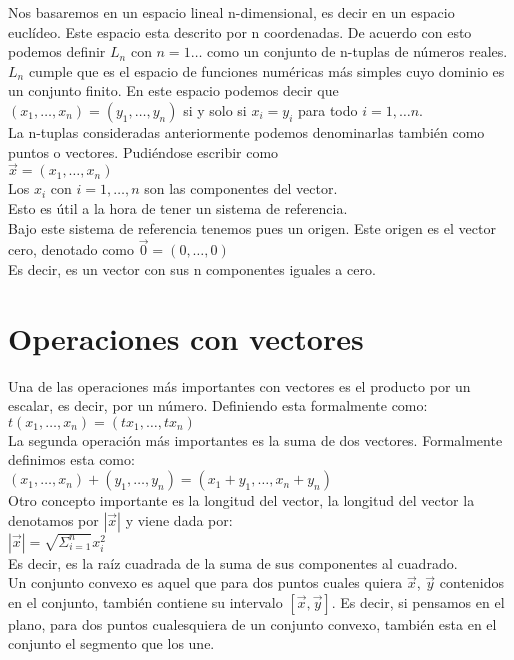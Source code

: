 \documentclass[10pt,a4paper]{book}
\begin{document}
Nos basaremos en un espacio lineal n-dimensional, es decir en un espacio euclídeo. Este espacio esta descrito por n coordenadas. De acuerdo con esto podemos definir $L_n$ con $n=1 \ldots$ como un conjunto de n-tuplas de números reales. $L_n$ cumple que es el espacio de funciones numéricas más simples cuyo dominio es un conjunto finito. En este espacio podemos decir que $(x_1, \ldots , x_n ) = (y_1, \ldots , y_n )$ si y solo si $x_i=y_i$ para todo $i=1, \ldots n$.\\
La n-tuplas consideradas anteriormente podemos denominarlas también como puntos o vectores. Pudiéndose escribir como \\
$\overrightarrow{x}=(x_1, \ldots , x_n )$\\
Los $x_i$ con $i=1 , \ldots, n $ son las componentes del vector.\\

Esto es útil a la hora de tener un sistema de referencia.\\
Bajo este sistema de referencia tenemos pues un origen. Este origen es el vector cero, denotado como $\overrightarrow{0}=(0, \ldots , 0 )$\\
Es decir, es un vector con sus n componentes iguales a cero.\\

\section{Operaciones con vectores}

Una de las operaciones más importantes con vectores es el producto por un escalar, es decir, por un número. Definiendo esta formalmente como:\\
$ t(x_1, \ldots , x_n )=(tx_1, \ldots , tx_n)$\\
La segunda operación más importantes es la suma de dos vectores. Formalmente definimos esta como:\\
$(x_1, \ldots , x_n )+ (y_1, \ldots , y_n ) = (x_1 + y_1, \ldots ,x_n + y_n )$\\

Otro concepto importante es la longitud del vector, la longitud del vector la denotamos por $ | \overrightarrow{x} | $ y viene dada por:\\
$ | \overrightarrow{x} | = \sqrt{\Sigma^{n}_{i=1}}x^2_i$\\
Es decir, es la raíz cuadrada de la suma de sus componentes al cuadrado.\\
 

Un conjunto convexo es aquel que para dos puntos cuales quiera $\overrightarrow{x}$, $\overrightarrow{y}$ contenidos en el conjunto, también contiene su intervalo $[\overrightarrow{x},\overrightarrow{y}]$. Es decir, si pensamos en el plano, para dos puntos cualesquiera de un conjunto convexo, también esta en el conjunto el segmento que los une.\\
\end{document}
